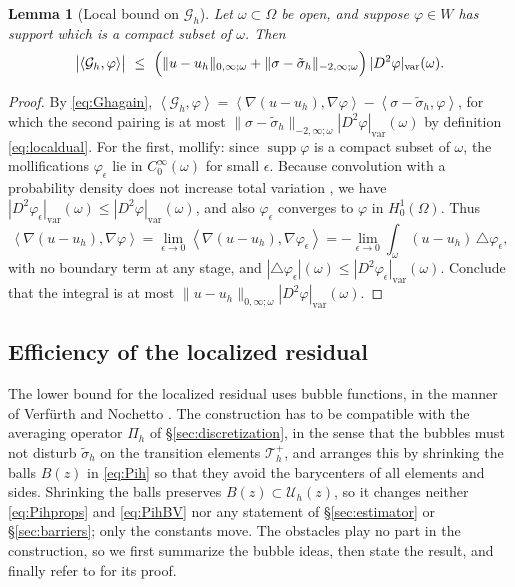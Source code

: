 \documentclass[12pt]{amsart}
\numberwithin{equation}{section}
\theoremstyle{plain}
\newtheorem{lemma}[theorem]{Lemma}
\theoremstyle{definition}
\theoremstyle{remark}
\newcommand{\eps}{\epsilon}
\newcommand{\Om}{\Omega}
\newcommand{\Th}{\mathcal{T}_h}
\newcommand{\Pih}{\Pi_h}
\newcommand{\Uh}{\mathcal{U}_h}
\newcommand{\Thplus}{\Th^+}
\newcommand{\Gh}{\mathcal{G}_h}
\begin{document}
\begin{lemma}[Local bound on $\Gh$]
\label{lem:Ghlocal}
Let $\omega \subset \Om$ be open, and suppose $\varphi \in W$ has support which is a compact subset of $\omega$.  Then
\begin{equation}
\label{eq:Ghlocal}
  \bigl|\left<\Gh,\varphi\right>\bigr| \ \le\ \Bigl(\|u-u_h\|_{0,\infty;\omega} + \|\sigma-\tilde\sigma_h\|_{-2,\infty;\omega}\Bigr)\,|D^2\varphi|_{\mathrm{var}}(\omega).
\end{equation}
\end{lemma}

\begin{proof} By \eqref{eq:Ghagain}, $\left<\Gh,\varphi\right> = \left<\nabla(u-u_h),\nabla\varphi\right> - \left<\sigma-\tilde\sigma_h,\varphi\right>$, for which the second pairing is at most $\|\sigma-\tilde\sigma_h\|_{-2,\infty;\omega}|D^2\varphi|_{\mathrm{var}}(\omega)$ by definition \eqref{eq:localdual}.  For the first, mollify: since $\operatorname{supp}\varphi$ is a compact subset of $\omega$, the mollifications $\varphi_\eps$ lie in $C_0^\infty(\omega)$ for small $\eps$.  Because convolution with a probability density does not increase total variation \cite[\S 5.2]{EvansGariepy2015}, we have $|D^2\varphi_\eps|_{\mathrm{var}}(\omega) \le |D^2\varphi|_{\mathrm{var}}(\omega)$, and also $\varphi_\eps$ converges to $\varphi$ in $H_0^1(\Om)$.  Thus
  $$\left<\nabla(u-u_h),\nabla\varphi\right> = \lim_{\eps\to 0} \left<\nabla(u-u_h),\nabla\varphi_\eps\right>
  = -\lim_{\eps\to 0} \int_\omega (u-u_h)\,\triangle\varphi_\eps,$$
with no boundary term at any stage, and $|\triangle\varphi_\eps|(\omega) \le |D^2\varphi_\eps|_{\mathrm{var}}(\omega)$.  Conclude that the integral is at most $\|u-u_h\|_{0,\infty;\omega} |D^2\varphi|_{\mathrm{var}}(\omega)$.  \end{proof}

\subsection{Efficiency of the localized residual}  The lower bound for the localized residual uses bubble functions, in the manner of Verf\"urth \cite{Verfurth1996} and Nochetto \cite{Nochetto1995}.  The construction has to be compatible with the averaging operator $\Pih$ of \S \ref{sec:discretization}, in the sense that the bubbles must not disturb $\tilde\sigma_h$ on the transition elements $\Thplus$, and \cite[Lemma 6.1]{NSV03} arranges this by shrinking the balls $B(z)$ in \eqref{eq:Pih} so that they avoid the barycenters of all elements and sides.  Shrinking the balls preserves $B(z) \subset \Uh(z)$, so it changes neither \eqref{eq:Pihprops} and \eqref{eq:PihBV} nor any statement of \S \ref{sec:estimator} or \S \ref{sec:barriers}; only the constants move.  The obstacles play no part in the construction, so we first summarize the bubble ideas, then state the result, and finally refer to \cite{NSV03} for its proof.
\end{document}
